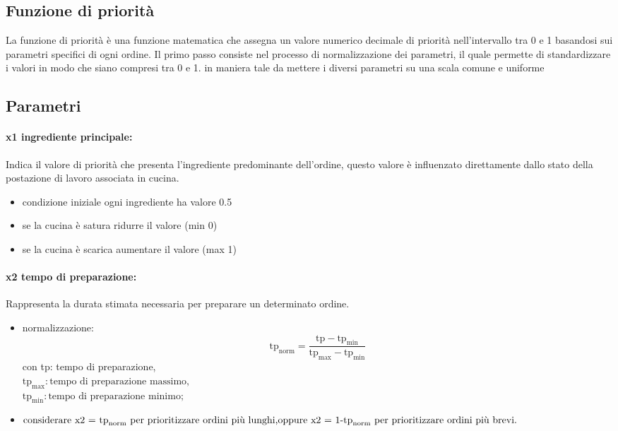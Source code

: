 \subsection{Funzione di priorità}
La funzione di priorità è una funzione matematica che assegna un valore numerico decimale di priorità nell’intervallo tra 0 e 1 basandosi sui parametri specifici di ogni ordine.
Il primo passo consiste nel processo di normalizzazione dei parametri, il quale permette di standardizzare i valori in modo che siano compresi tra 0 e 1. in maniera tale da mettere i diversi parametri su una scala comune e uniforme

\subsection*{Parametri}

\paragraph{x1 ingrediente principale:}
Indica il valore di priorità che presenta l'ingrediente predominante dell’ordine, questo valore è influenzato direttamente dallo stato della postazione di lavoro associata in cucina.
\begin{itemize}	
	\item condizione iniziale ogni ingrediente ha valore 0.5
	\item se la cucina è satura ridurre il valore (min 0)
	\item se la cucina è scarica aumentare il valore (max 1)
\end{itemize}

\paragraph{x2 tempo di preparazione:}
Rappresenta la durata stimata necessaria per preparare un determinato ordine.
\begin{itemize}	
	\item normalizzazione: \begin{equation*}
 		\text{tp}_{\text{norm}} = \frac{\text{tp} - \text{tp}_{\text{min}}}{\text{tp}_{\text{max}} - \text{tp}_{\text{min}}}
 	\end{equation*} con tp: tempo di preparazione,\\
 	$\text{tp}_{\text{max}}: \text{tempo di preparazione massimo,}$\\
 	$\text{tp}_{\text{min}}: \text{tempo di preparazione minimo;}$	
	\item $\text{considerare x2 = tp}_{\text{norm}} \text{ per prioritizzare ordini più lunghi,}\\ \text{oppure x2 = 1-tp}_{\text{norm}} \text{ per prioritizzare ordini più brevi.}$
\end{itemize}

